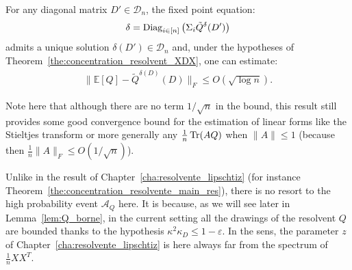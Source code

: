 \documentclass[a4papaer, titlepage]{book}
\begin{document}
\begin{theorem}\label{the:estimation_resolvent_XDX}
  For any diagonal matrix $D' \in \mathcal{D}_{n}$, the fixed point equation:
  \begin{align*}
    \delta = \operatorname{Diag}_{i\in [n]} \left( \Sigma_i \tilde Q^\delta(D') \right)
  \end{align*}
  admits a unique solution $\delta(D') \in \mathcal D_n$ and, under the hypotheses of Theorem~\ref{the:concentration_resolvent_XDX}, 
  one can estimate:
  \begin{align*}
    \|\mathbb E[Q ]-\tilde Q^{\delta(D)}(D)\|_F \leq O(\sqrt{\log n}).
  \end{align*}
 \end{theorem}
 \begin{remark}\label{rem:convergence_OD_1}
    Note here that although there are no term $1/\sqrt n$ in the bound, this result still provides some good convergence bound for the estimation of linear forms like the Stieltjes transform or more generally any $\frac{1}{n}\operatorname{Tr}(AQ)$ when $\|A\| \leq 1$ (because then $\frac{1}{n}\|A\|_F \leq O(1/\sqrt n)$).
 \end{remark}
 \begin{remark}\label{rem:event_AQ_not_needed}
   Unlike in the result of Chapter~\ref{cha:resolvente_lipschtiz} (for instance Theorem~\ref{the:concentration_resolvente_main_res}), there is no resort to the high probability event $\mathcal A_Q$ here. It is because, as we will see later in Lemma~\ref{lem:Q_borne}, in the current setting all the drawings of the resolvent $Q$ are bounded thanks to the hypothesis $\kappa^2 \kappa_D\leq 1-\varepsilon$. 
   In the sens, the parameter $z$ of Chapter~\ref{cha:resolvente_lipschtiz} is here always far from the spectrum of $\frac{1}{n}XX^T$.
 \end{remark}
 
\end{document}
